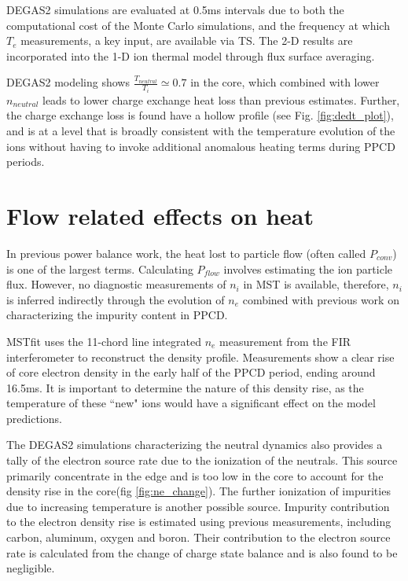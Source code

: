 \documentclass[aip, pop, preprint]{revtex4-1}
\begin{document}
DEGAS2 simulations are evaluated at 0.5ms intervals due to both the
computational cost of the Monte Carlo simulations, and the frequency at which $
T_e $ measurements, a key input, are available via TS. The 2-D results are
incorporated into the 1-D ion thermal model through flux surface averaging.

DEGAS2 modeling shows $\frac{T_{neutral}}{T_{i}} \simeq 0.7$ in the core, which combined with lower $ n_{neutral} $ leads to
lower charge exchange heat loss than previous estimates. Further, the charge
exchange loss is found have a hollow profile (see Fig. \ref{fig:dedt_plot}), and is at a level that is broadly
consistent with the temperature evolution of the ions without having to invoke
additional anomalous heating terms during PPCD periods. 

\section{Flow related effects on heat}\label{flow_effects}

In previous power balance work, the heat lost to particle flow (often called $P_{conv}$) is one of the largest terms\cite{Fiksel2006}. Calculating $P_{flow}$ involves estimating the ion
particle flux.  However, no diagnostic measurements of $n_i$ in MST is
available, therefore, $n_i$ is inferred indirectly through the evolution of
$n_e$ combined with previous work on characterizing the impurity content in
PPCD\cite{Kumar2012,Nornberg2018IncorporatingCharge}.

MSTfit uses the 11-chord line integrated $n_e$ measurement from the FIR
interferometer to reconstruct the density profile. Measurements show a clear rise of
core electron density in the early half of the PPCD period, ending around 16.5ms. It is
important to determine the nature of this density rise, as the temperature of
these ``new" ions would have a significant effect on the model predictions.

The DEGAS2 simulations characterizing the neutral dynamics also provides a
tally of the electron source rate due to the ionization of the neutrals. This
source primarily concentrate in the edge and is too low in the core to account
for the density rise in the core(fig \ref{fig:ne_change}). The further
ionization of impurities due to increasing temperature is another possible
source. Impurity contribution to the electron density rise is estimated using
previous measurements, including carbon, aluminum, oxygen and boron\cite{Kumar2012a, Nornberg2018IncorporatingCharge}. Their contribution to the electron source
rate is calculated from the change of charge state balance and is also found to be negligible.
\end{document}
